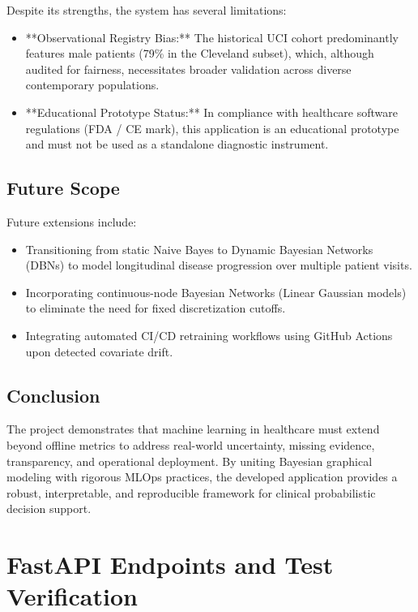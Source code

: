 \documentclass[12pt,a4paper]{report}
\begin{document}
Despite its strengths, the system has several limitations:
\begin{itemize}
\item **Observational Registry Bias:** The historical UCI cohort predominantly features male patients (79\% in the Cleveland subset), which, although audited for fairness, necessitates broader validation across diverse contemporary populations.
\item **Educational Prototype Status:** In compliance with healthcare software regulations (FDA / CE mark), this application is an educational prototype and must not be used as a standalone diagnostic instrument.
\end{itemize}

\section{Future Scope}

Future extensions include:
\begin{itemize}
\item Transitioning from static Naive Bayes to Dynamic Bayesian Networks (DBNs) to model longitudinal disease progression over multiple patient visits.
\item Incorporating continuous-node Bayesian Networks (Linear Gaussian models) to eliminate the need for fixed discretization cutoffs.
\item Integrating automated CI/CD retraining workflows using GitHub Actions upon detected covariate drift.
\end{itemize}

\section{Conclusion}

The project demonstrates that machine learning in healthcare must extend beyond offline metrics to address real-world uncertainty, missing evidence, transparency, and operational deployment. By uniting Bayesian graphical modeling with rigorous MLOps practices, the developed application provides a robust, interpretable, and reproducible framework for clinical probabilistic decision support.

\appendix
\chapter{FastAPI Endpoints and Test Verification}
\label{appendix:api_testing}
\end{document}
